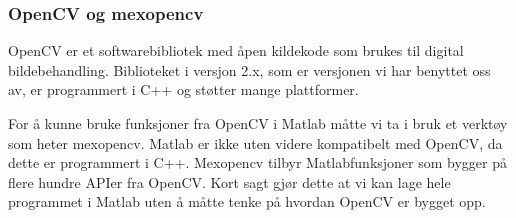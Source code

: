 \subsubsection{OpenCV og mexopencv}
OpenCV er et softwarebibliotek med åpen kildekode som brukes til digital bildebehandling. Biblioteket i versjon 2.x, som er versjonen vi har benyttet oss av, er programmert i C++ og støtter mange plattformer. \cite{docs:opencv}

For å kunne bruke funksjoner fra OpenCV i Matlab måtte vi ta i bruk et verktøy som heter mexopencv. Matlab er ikke uten videre kompatibelt med OpenCV, da dette er programmert i C++. Mexopencv tilbyr Matlabfunksjoner som bygger på flere hundre APIer fra OpenCV. \cite{mexopencv} Kort sagt gjør dette at vi kan lage hele programmet i Matlab uten å måtte tenke på hvordan OpenCV er bygget opp.
